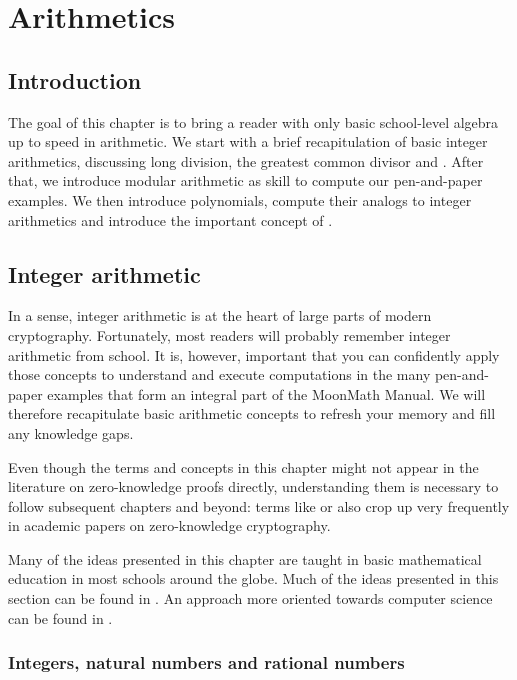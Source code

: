 \chapter{Arithmetics}\label{chap:arithmetic}\label{chap:arithmetics}

\section{Introduction}

The goal of this chapter is to bring a reader with only basic school-level algebra up to speed in arithmetic. We start with a brief recapitulation of basic integer arithmetics, discussing long division, the greatest common divisor and . After that, we introduce modular arithmetic as  skill to compute our pen-and-paper examples. We then introduce polynomials, compute their analogs to integer arithmetics and introduce the important concept of .

\section{Integer arithmetic}
\label{integer_arithmetic}
In a sense, integer arithmetic is at the heart of large parts of modern cryptography. Fortunately, most readers will probably remember integer arithmetic from school. It is, however, important that you can confidently apply those concepts to understand and execute computations in the many pen-and-paper examples that form an integral part of the MoonMath Manual. We will therefore recapitulate basic arithmetic concepts to refresh your memory and fill any knowledge gaps.

Even though the terms and concepts in this chapter might not appear in the literature on zero-knowledge proofs directly, understanding them is necessary to follow subsequent chapters and beyond: terms like  or  also crop up very frequently in academic papers on zero-knowledge cryptography.

Many of the ideas presented in this chapter are taught in basic mathematical education in most schools around the globe. Much of the ideas presented in this section can be found in \cite{wu-1}. An approach more oriented towards computer science can be found in \cite{mignotte-1992}.

\subsection{Integers, natural numbers and rational numbers}

